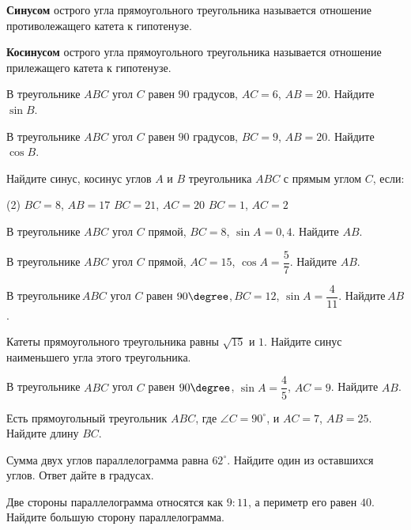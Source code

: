 \begin{class}[number=3]
	\begin{definit}
		\textbf{Синусом} острого угла прямоугольного треугольника называется отношение противолежащего катета к гипотенузе.
	\end{definit}
	\begin{definit}
		\textbf{Косинусом} острого угла прямоугольного треугольника называется отношение прилежащего катета к гипотенузе.
	\end{definit}
	\begin{listofex}
		\item В треугольнике \( ABC \) угол \( C \) равен \( 90 \) градусов, \( AC=6 \), \( AB=20 \). Найдите \( \sin B \).
		\item  В треугольнике \( ABC \) угол \( C \) равен \( 90 \) градусов, \( BC=9 \), \( AB=20 \). Найдите \( \cos B \).
		\item Найдите синус, косинус углов \( A \) и \( B \) треугольника \( ABC \) с прямым углом \( C \), если:
		\begin{tasks}(2)
			\task \( BC=8 \), \( AB=17 \)
			\task \( BC=21 \), \( AC=20 \)
			\task \( BC=1 \), \( AC=2 \)
		\end{tasks}
		
		\item В треугольнике \( ABC \) угол \( C \) прямой, \( BC=8 \), \( \sin A=0,4 \). Найдите \( AB \).
		\item В треугольнике \( ABC \) угол \( C \) прямой, \( AC=15 \), \( \cos A=\dfrac{5}{7} \). Найдите \( AB \).
		\item В треугольнике \( ABC \) угол \( C \) равен \( 90\degree \), \( BC=12 \), \( \sin A=\dfrac{4}{11} \). Найдите \( AB \).
		\item Катеты прямоугольного треугольника равны \( \sqrt{15} \) и \( 1 \). Найдите синус наименьшего угла этого треугольника.
		\item В треугольнике \( ABC \) угол \( C \) равен \( 90\degree \), \( \sin A=\dfrac{4}{5} \), \( AC=9 \). Найдите \( AB \).
		\item  Есть прямоугольный треугольник \( ABC \), где \( \angle C=90^{\circ} \), и \( AC=7 \), \( AB=25 \). Найдите длину \( BC \).
		\item Сумма двух углов параллелограмма равна \( 62^{\circ} \). Найдите один из оставшихся углов. Ответ дайте в градусах.
		\item Две стороны параллелограмма относятся как \( 9:11 \), а периметр его равен \( 40 \). Найдите большую сторону параллелограмма.
	\end{listofex}
\end{class}

